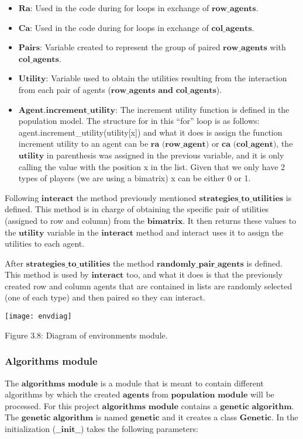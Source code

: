 \documentclass{article}
\begin{document}
\begin{itemize}
\item $\textbf{Ra}$: Used in the code during for loops in exchange of $\textbf{row\_agents}$.
\item $\textbf{Ca}$: Used in the code during for loops in exchange of $\textbf{col\_agents}$.
\item $\textbf{Pairs}$: Variable created to represent the group of paired $\textbf{row\_agents}$ with $\textbf{col\_agents}$.
\item $\textbf{Utility}$: Variable used to obtain the utilities resulting from the interaction from each pair of agents ($\textbf{row\_agents and col\_agents}$).
\item $\textbf{Agent.increment\_utility}$: The increment utility function is defined in the population model. The structure for in this “for” loop is as follows:
\\ agent.increment\_utility(utility[x]) and what it does is assign the function increment utility to an agent can be $\textbf{ra (row\_agent)}$ or$\textbf{ ca (col\_agent)}$, the $\textbf{utility}$ in parenthesis was assigned in the previous variable, and it is only calling the value with the position x in the list. Given that we only have 2 types of players (we are using a bimatrix) x can be either 0 or 1.
\end{itemize}

Following $\textbf{interact}$ the method previously mentioned $\textbf{strategies\_to\_utilities}$ is defined. This method is in charge of obtaining the specific pair of utilities (assigned to row and column) from the $\textbf{bimatrix}$. It then returns these values to the $\textbf{utility}$ variable in the $\textbf{interact}$ method and interact uses it to assign the utilities to each agent.

After $\textbf{strategies\_to\_utilities}$ the method $\textbf{randomly\_pair\_agents}$ is defined. This method is used by $\textbf{interact}$ too, and what it does is that the previously created row and column agents that are contained in lists are randomly selected (one of each type) and then paired so they can interact.

\begin{center}
	\texttt{[image: envdiag]}

Figure 3.8: Diagram of environments module.
\end{center}

\newpage
\subsubsection{Algorithms module}
The $\textbf{algorithms module}$ is a module that is meant to contain different algorithms by which the created $\textbf{agents}$ from $\textbf{population module}$ will be processed. For this project $\textbf{algorithms module}$ contains a $\textbf{genetic algorithm}$.
The  $\textbf{genetic algorithm}$ is named  $\textbf{genetic}$ and it creates a class  $\textbf{Genetic}$. In the initialization ($\textbf{\_\_init\_\_}$) takes the following parameters:
\end{document}
